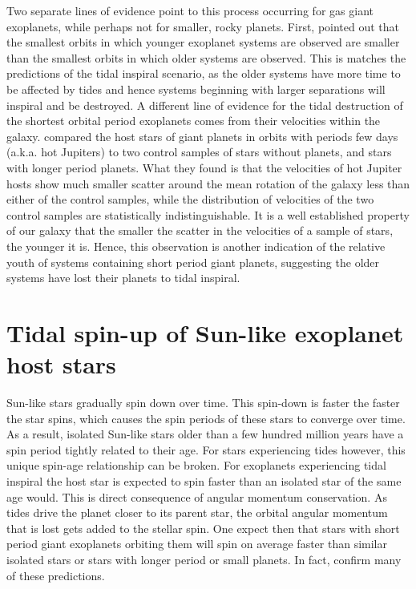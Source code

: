 Two separate lines of evidence point to this process occurring for gas giant
exoplanets, while perhaps not for smaller, rocky planets. First,
\citet{Jackson_et_al_09} pointed out that the smallest orbits in which younger
exoplanet systems are observed are smaller than the smallest orbits in which
older systems are observed. This is matches the predictions of the tidal
inspiral scenario, as the older systems have more time to be affected by tides
and hence systems beginning with larger separations will inspiral and be
destroyed. A different line of evidence for the tidal destruction of the
shortest orbital period exoplanets comes from their velocities within the
galaxy. \citet{Hamer_Schlaufman_19} compared the host stars of giant planets in
orbits with periods few days (a.k.a. hot Jupiters) to two control samples of
stars without planets, and stars with longer period planets. What they found is
that the velocities of hot Jupiter hosts show much smaller scatter around the
mean rotation of the galaxy less than either of the control samples, while the
distribution of velocities of the two control samples are statistically
indistinguishable. It is a well established property of our galaxy that the
smaller the scatter in the velocities of a sample of stars, the younger it is.
Hence, this observation is another indication of the relative youth of systems
containing short period giant planets, suggesting the older systems have lost
their planets to tidal inspiral.

\section{Tidal spin-up of Sun-like exoplanet host stars}

Sun-like stars gradually spin down over time. This spin-down is faster the
faster the star spins, which causes the spin periods of these stars to converge
over time. As a result, isolated Sun-like stars older than a few hundred million
years have a spin period tightly related to their age. For stars experiencing
tides however, this unique spin-age relationship can be broken. For exoplanets
experiencing tidal inspiral the host star is expected to spin faster than an
isolated star of the same age would. This is direct consequence of angular
momentum conservation. As tides drive the planet closer to its parent star, the
orbital angular momentum that is lost gets added to the stellar spin. One expect
then that stars with short period giant exoplanets orbiting them will spin on
average faster than similar isolated stars or stars with longer period or small
planets. In fact, \citet{Tajeda_et_al_21} confirm many of these predictions.

